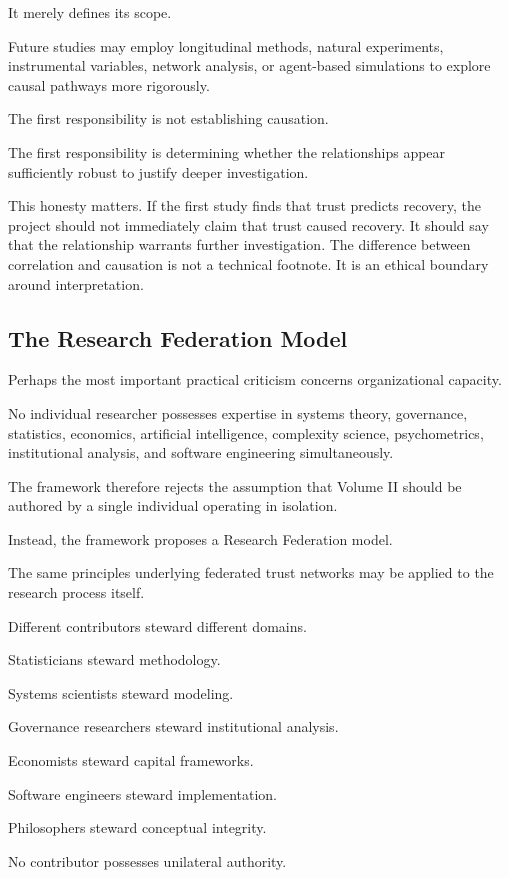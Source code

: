 \documentclass[12pt]{article}
\begin{document}
It merely defines its scope.

Future studies may employ longitudinal methods, natural experiments, instrumental variables, network analysis, or agent-based simulations to explore causal pathways more rigorously.

The first responsibility is not establishing causation.

The first responsibility is determining whether the relationships appear sufficiently robust to justify deeper investigation.

This honesty matters. If the first study finds that trust predicts recovery, the project should not immediately claim that trust caused recovery. It should say that the relationship warrants further investigation. The difference between correlation and causation is not a technical footnote. It is an ethical boundary around interpretation.

\subsection{The Research Federation Model}

Perhaps the most important practical criticism concerns organizational capacity.

No individual researcher possesses expertise in systems theory, governance, statistics, economics, artificial intelligence, complexity science, psychometrics, institutional analysis, and software engineering simultaneously.

The framework therefore rejects the assumption that Volume II should be authored by a single individual operating in isolation.

Instead, the framework proposes a Research Federation model.

The same principles underlying federated trust networks may be applied to the research process itself.

Different contributors steward different domains.

Statisticians steward methodology.

Systems scientists steward modeling.

Governance researchers steward institutional analysis.

Economists steward capital frameworks.

Software engineers steward implementation.

Philosophers steward conceptual integrity.

No contributor possesses unilateral authority.
\end{document}
